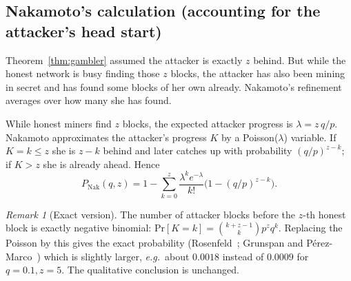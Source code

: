 \documentclass[11pt,a4paper]{article}
\newenvironment{plainenglish}{\par\smallskip}{\par\smallskip}
\newenvironment{formal}{\par\smallskip}{\par\smallskip}
\theoremstyle{definition}
\theoremstyle{plain}
\theoremstyle{remark}
\newtheorem{remark}[definition]{Remark}
\renewcommand{\Pr}{\mathrm{Pr}}
\newcommand{\eg}{\textit{e.g.}}
\begin{document}
\subsection{Nakamoto's calculation (accounting for the attacker's head start)}

\begin{plainenglish}
Theorem~\ref{thm:gambler} assumed the attacker is exactly $z$ behind. But while the honest network is busy finding those $z$ blocks, the attacker has also been mining in secret and has found some blocks of her own already.
Nakamoto's refinement averages over how many she has found.
\end{plainenglish}

\begin{formal}
While honest miners find $z$ blocks, the expected attacker progress is $\lambda=z\,q/p$. Nakamoto approximates the attacker's progress $K$ by a Poisson($\lambda$) variable. If $K=k\le z$ she is $z-k$ behind and later catches up with probability $(q/p)^{z-k}$; if $K>z$ she is already ahead. Hence
$$P_{\text{Nak}}(q,z)=1-\sum_{k=0}^{z}\frac{\lambda^ke^{-\lambda}}{k!}\Big(1-(q/p)^{z-k}\Big).$$
\begin{remark}[Exact version]
The number of attacker blocks before the $z$-th honest block is exactly negative binomial: $\Pr[K=k]=\binom{k+z-1}{k}p^zq^k$. Replacing the Poisson by this gives the exact probability
(Rosenfeld~\cite{Ros14}; Grunspan and P\'erez-Marco~\cite{GP18}) which is slightly larger, \eg\ about $0.0018$ instead of $0.0009$ for $q=0.1,z=5$. The qualitative conclusion is unchanged.
\end{remark}
\end{formal}
\end{document}
